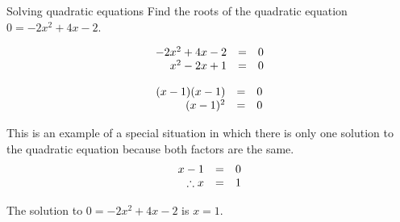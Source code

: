 \begin{wex}{ Solving quadratic equations }
{Find the roots of the quadratic equation  $0=-2{x}^{2}+4x-2$.}
{
\begin{equation*}
\begin{array}{ccc}\hfill -2{x}^{2}+4x-2& =& 0\hfill \\ \hfill {x}^{2}-2x+1& =& 0\hfill \end{array}
\end{equation*}


\begin{equation*}
\begin{array}{ccc} \hfill (x-1)(x-1) &=& 0 \hfill \\
\hfill (x-1)^{2} &=&0 \hfill 
\end{array}
\end{equation*}

This is an example of a special situation in which there is only one solution to the quadratic equation because both factors are the same.
\begin{equation*}
\begin{array}{ccc} \hfill x -1 &=& 0 \hfill \\
\hfill \therefore x &=&1 \hfill 
\end{array}
\end{equation*}


 
The solution to $0=-2{x}^{2}+4x-2$ is $x=1$.
}
\end{wex}


